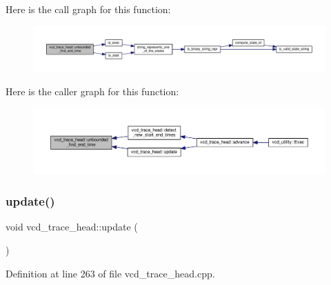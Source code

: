 Here is the call graph for this function\+:
\nopagebreak
\begin{figure}[H]
\begin{center}
\leavevmode
\includegraphics[width=350pt]{df/d30/structvcd__trace__head_aefd02e39314983a9e8b2ce299d8482f1_cgraph}
\end{center}
\end{figure}
Here is the caller graph for this function\+:
\nopagebreak
\begin{figure}[H]
\begin{center}
\leavevmode
\includegraphics[width=350pt]{df/d30/structvcd__trace__head_aefd02e39314983a9e8b2ce299d8482f1_icgraph}
\end{center}
\end{figure}
\mbox{\label{structvcd__trace__head_afebefebabc382bd2bd3d408f852668a8}} 
\subsubsection{\texorpdfstring{update()}{update()}}
{\footnotesize\ttfamily void vcd\+\_\+trace\+\_\+head\+::update (\begin{DoxyParamCaption}{ }\end{DoxyParamCaption})\hspace{0.3cm}{\ttfamily [protected]}}



Definition at line 263 of file vcd\+\_\+trace\+\_\+head.\+cpp.



